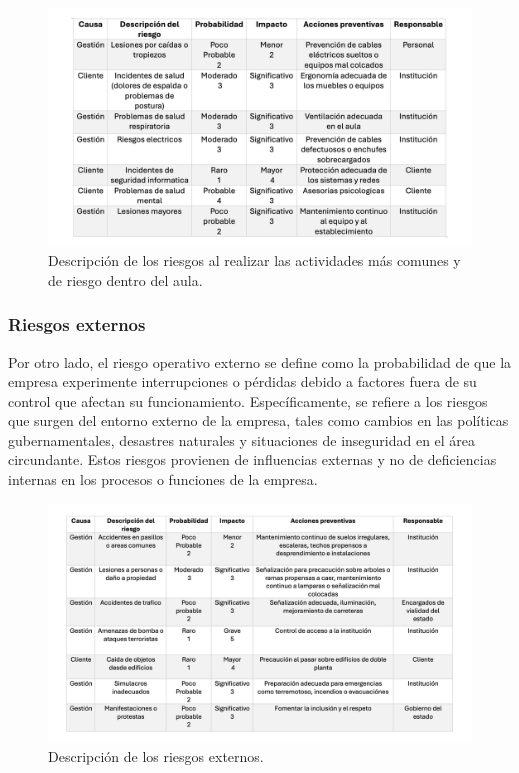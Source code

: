     \begin{figure}[H]
        \centering
        \includegraphics[scale=0.17]{15/img/talaRiesgosInternos.pdf}
        \caption{Descripción de los riesgos al realizar las actividades más comunes y de riesgo dentro del aula.}
        \label{fig:tablaRiesgosInternos}
    \end{figure}
    
    \subsubsection{Riesgos externos}
    Por otro lado, el riesgo operativo externo se define como la probabilidad de que la empresa experimente interrupciones o pérdidas debido a factores fuera de su control que afectan su funcionamiento. Específicamente, se refiere a los riesgos que surgen del entorno externo de la empresa, tales como cambios en las políticas gubernamentales, desastres naturales y situaciones de inseguridad en el área circundante. Estos riesgos provienen de influencias externas y no de deficiencias internas en los procesos o funciones de la empresa.
    
    \begin{figure}[H]
        \centering
        \includegraphics[scale=0.17]{15/img/talaRiesgosExternos.pdf}
        \caption{Descripción de los riesgos externos.}
        \label{fig:tablaRiesgosExternos}
    \end{figure}
    
